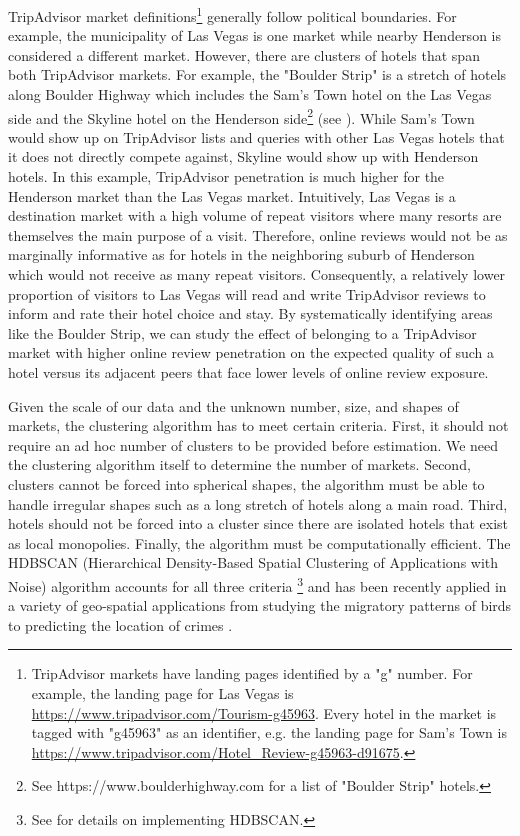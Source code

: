 \documentclass[mksc,blindrev]{informs3} %
\begin{document}
TripAdvisor market definitions\footnote{TripAdvisor markets have landing pages identified by a "g" number. For example, the landing page for Las Vegas is \url{https://www.tripadvisor.com/Tourism-g45963}. Every hotel in the market is tagged with "g45963" as an identifier, e.g. the landing page for Sam's Town is \url{https://www.tripadvisor.com/Hotel_Review-g45963-d91675}.} generally follow political boundaries. For example, the municipality of Las Vegas is one market while nearby Henderson is considered a different market. However, there are clusters of hotels that span both TripAdvisor markets. For example, the "Boulder Strip" is a stretch of hotels along Boulder Highway which includes the Sam's Town hotel on the Las Vegas side and the Skyline hotel on the Henderson side\footnote{See https://www.boulderhighway.com for a list of "Boulder Strip" hotels.} (see ). While Sam's Town would show up on TripAdvisor lists and queries with other Las Vegas hotels that it does not directly compete against, Skyline would show up with Henderson hotels. In this example, TripAdvisor penetration is much higher for the Henderson market than the Las Vegas market. Intuitively, Las Vegas is a destination market with a high volume of repeat visitors where many resorts are themselves the main purpose of a visit. Therefore, online reviews would not be as marginally informative as for hotels in the neighboring suburb of Henderson which would not receive as many repeat visitors. Consequently, a relatively lower proportion of visitors to Las Vegas will read and write TripAdvisor reviews to inform and rate their hotel choice and stay. By systematically identifying areas like the Boulder Strip, we can study the effect of belonging to a TripAdvisor market with higher online review penetration on the expected quality of such a hotel versus its adjacent peers that face lower levels of online review exposure.

Given the scale of our data and the unknown number, size, and shapes of markets, the clustering algorithm has to meet certain criteria. First, it should not require an ad hoc number of clusters to be provided before estimation. We need the clustering algorithm itself to determine the number of markets. Second, clusters cannot be forced into spherical shapes, the algorithm must be able to handle irregular shapes such as a long stretch of hotels along a main road. Third, hotels should not be forced into a cluster since there are isolated hotels that exist as local monopolies. Finally, the algorithm must be computationally efficient.  The HDBSCAN (Hierarchical Density-Based Spatial Clustering of Applications with Noise) algorithm accounts for all three criteria \citep{campello2013density,mcinnes2017hdbscan}\footnote{See \citet{mcinnes2017hdbscan} for details on implementing HDBSCAN.} and has been recently applied in a variety of geo-spatial applications from studying the migratory patterns of birds \citep{tang2009discovery} to predicting the location of crimes \citep{bappee2018predicting}.  
\end{document}
